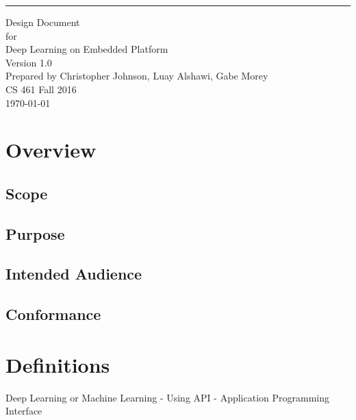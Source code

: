 \documentclass{scrreprt}
\date{}
\newcommand\blankpage{%
    \null
    \thispagestyle{empty}%
    \addtocounter{page}{-1}%
    \newpage}
\def\myversion{1.0 }
\begin{document}
\begin{flushright}
    \rule{16cm}{5pt}\vskip1cm
    \begin{bfseries}
        \Huge{Design Document}\\
        \vspace{1.9cm}
        for\\
        \vspace{1.9cm}
        Deep Learning on Embedded Platform\\
        \vspace{1.9cm}
        \LARGE{Version \myversion}\\
        \vspace{1.9cm}
        Prepared by Christopher Johnson, Luay Alshawi, Gabe Morey\\
        \vspace{1.9cm}
        CS 461 Fall 2016\\
        \vspace{1.9cm}
        \today\\
    \end{bfseries}
\end{flushright}
\afterpage{\blankpage}

\tableofcontents

\chapter{Overview}
\section{Scope}

\section{Purpose}

\section{Intended Audience}

\section{Conformance}

\chapter{Definitions}

Deep Learning or Machine Learning - Using
API - Application Programming Interface
\end{document}
